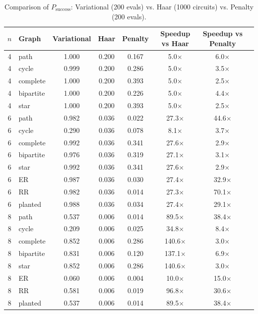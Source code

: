 \begin{table}[ht]
\centering
\caption{Comparison of $P_{\mathrm{success}}$: Variational (200 evals) vs. Haar (1000 circuits) vs. Penalty (200 evals).}
\label{tab:comparison_main}
\begin{tabular}{clcccccc}
\toprule
$n$ & Graph & Variational & Haar & Penalty & Speedup vs Haar & Speedup vs Penalty \\
\midrule
4 & path & 1.000 & 0.200 & 0.167 & 5.0$\times$ & 6.0$\times$ \\
4 & cycle & 0.999 & 0.200 & 0.286 & 5.0$\times$ & 3.5$\times$ \\
4 & complete & 1.000 & 0.200 & 0.393 & 5.0$\times$ & 2.5$\times$ \\
4 & bipartite & 1.000 & 0.200 & 0.226 & 5.0$\times$ & 4.4$\times$ \\
4 & star & 1.000 & 0.200 & 0.393 & 5.0$\times$ & 2.5$\times$ \\
\midrule
6 & path & 0.982 & 0.036 & 0.022 & 27.3$\times$ & 44.6$\times$ \\
6 & cycle & 0.290 & 0.036 & 0.078 & 8.1$\times$ & 3.7$\times$ \\
6 & complete & 0.992 & 0.036 & 0.341 & 27.6$\times$ & 2.9$\times$ \\
6 & bipartite & 0.976 & 0.036 & 0.319 & 27.1$\times$ & 3.1$\times$ \\
6 & star & 0.992 & 0.036 & 0.341 & 27.6$\times$ & 2.9$\times$ \\
6 & ER & 0.987 & 0.036 & 0.030 & 27.4$\times$ & 32.9$\times$ \\
6 & RR & 0.982 & 0.036 & 0.014 & 27.3$\times$ & 70.1$\times$ \\
6 & planted & 0.988 & 0.036 & 0.034 & 27.4$\times$ & 29.1$\times$ \\
\midrule
8 & path & 0.537 & 0.006 & 0.014 & 89.5$\times$ & 38.4$\times$ \\
8 & cycle & 0.209 & 0.006 & 0.025 & 34.8$\times$ & 8.4$\times$ \\
8 & complete & 0.852 & 0.006 & 0.286 & 140.6$\times$ & 3.0$\times$ \\
8 & bipartite & 0.831 & 0.006 & 0.120 & 137.1$\times$ & 6.9$\times$ \\
8 & star & 0.852 & 0.006 & 0.286 & 140.6$\times$ & 3.0$\times$ \\
8 & ER & 0.060 & 0.006 & 0.004 & 10.0$\times$ & 15.0$\times$ \\
8 & RR & 0.581 & 0.006 & 0.019 & 96.8$\times$ & 30.6$\times$ \\
8 & planted & 0.537 & 0.006 & 0.014 & 89.5$\times$ & 38.4$\times$ \\

\end{tabular}
\end{table}
